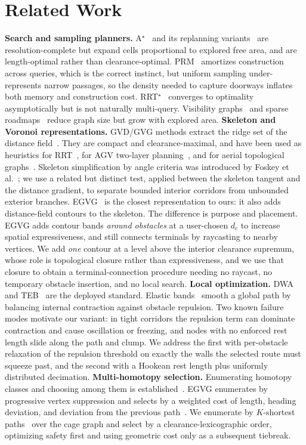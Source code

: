 \documentclass[conference]{IEEEtran}
\begin{document}
\section{Related Work}
\textbf{Search and sampling planners.} A$^\star$~\cite{hart1968} and its replanning variants~\cite{koenig2005} are resolution-complete but expand cells proportional to explored free area, and are length-optimal rather than clearance-optimal. PRM~\cite{kavraki1996} amortizes construction across queries, which is the correct instinct, but uniform sampling under-represents narrow passages, so the density needed to capture doorways inflates both memory and construction cost. RRT$^\star$~\cite{karaman2011,lavalle1998} converges to optimality asymptotically but is not naturally multi-query. Visibility graphs~\cite{yang2022far} and sparse roadmaps~\cite{dobson2014} reduce graph size but grow with explored area.
\textbf{Skeleton and Voronoi representations.} GVD/GVG methods extract the ridge set of the distance field~\cite{lau2013,hoff1999}. They are compact and clearance-maximal, and have been used as heuristics for RRT~\cite{chi2022}, for AGV two-layer planning~\cite{zhang2024agv}, and for aerial topological graphs~\cite{oleynikova2018}. Skeleton simplification by angle criteria was introduced by Foskey et al.~\cite{foskey2003}; we use a related but distinct test, applied between the skeleton tangent and the distance gradient, to separate bounded interior corridors from unbounded exterior branches. EGVG~\cite{qi2025egvg} is the closest representation to ours: it also adds distance-field contours to the skeleton. The difference is purpose and placement. EGVG adds contour bands \emph{around obstacles} at a user-chosen $d_c$ to increase spatial expressiveness, and still connects terminals by raycasting to nearby vertices. We add \emph{one} contour at a level above the interior clearance supremum, whose role is topological closure rather than expressiveness, and we use that closure to obtain a terminal-connection procedure needing no raycast, no temporary obstacle insertion, and no local search.
\textbf{Local optimization.} DWA~\cite{fox1997} and TEB~\cite{rosmann2012} are the deployed standard. Elastic bands~\cite{quinlan1993} smooth a global path by balancing internal contraction against obstacle repulsion. Two known failure modes motivate our variant: in tight corridors the repulsion term can dominate contraction and cause oscillation or freezing, and nodes with no enforced rest length slide along the path and clump. We address the first with per-obstacle relaxation of the repulsion threshold on exactly the walls the selected route must squeeze past, and the second with a Hookean rest length plus uniformly distributed decimation.
\textbf{Multi-homotopy selection.} Enumerating homotopy classes and choosing among them is established~\cite{bhattacharya2012,qi2025egvg}. EGVG enumerates by progressive vertex suppression and selects by a weighted cost of length, heading deviation, and deviation from the previous path~\cite{qi2025egvg}. We enumerate by $K$-shortest paths~\cite{yen1971} over the cage graph and select by a clearance-lexicographic order, optimizing safety first and using geometric cost only as a subsequent tiebreak.
\end{document}
